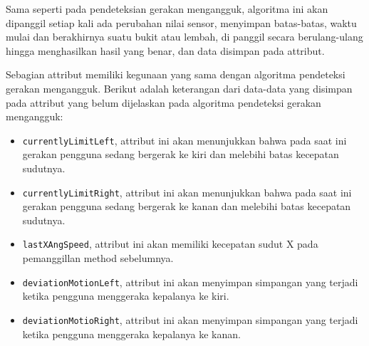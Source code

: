 Sama seperti pada pendeteksian gerakan mengangguk, algoritma ini akan dipanggil setiap kali ada perubahan nilai sensor, menyimpan batas-batas, waktu mulai dan berakhirnya suatu bukit atau lembah, di panggil secara berulang-ulang hingga menghasilkan hasil yang benar, dan data disimpan pada attribut.

Sebagian attribut memiliki kegunaan yang sama dengan algoritma pendeteksi gerakan mengangguk. Berikut adalah keterangan dari data-data yang disimpan pada attribut yang belum dijelaskan pada algoritma pendeteksi gerakan mengangguk:
\begin{itemize}
	\item \texttt{currentlyLimitLeft}, attribut ini akan menunjukkan bahwa pada saat ini gerakan pengguna sedang bergerak ke kiri dan melebihi batas kecepatan sudutnya.
	\item \texttt{currentlyLimitRight}, attribut ini akan menunjukkan bahwa pada saat ini gerakan pengguna sedang bergerak ke kanan dan melebihi batas kecepatan sudutnya.
	\item \texttt{lastXAngSpeed}, attribut ini akan memiliki kecepatan sudut X pada pemanggillan method sebelumnya. 
	\item \texttt{deviationMotionLeft}, attribut ini akan menyimpan simpangan yang terjadi ketika pengguna menggeraka kepalanya ke kiri. 
	\item \texttt{deviationMotioRight}, attribut ini akan menyimpan simpangan yang terjadi ketika pengguna menggeraka kepalanya ke kanan. 
\end{itemize}


